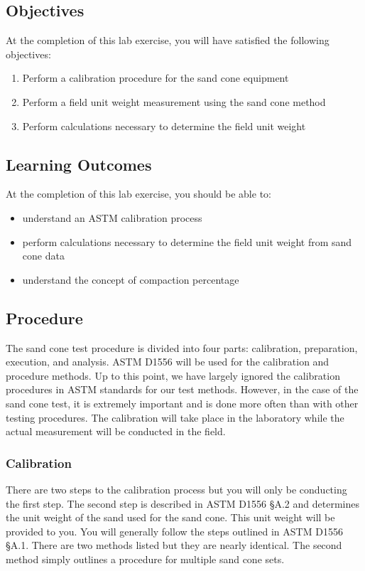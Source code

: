 \documentclass[12pt]{article}
\begin{document}
\subsection{Objectives}
\label{ssec:headingscap}
At the completion of this lab exercise, you will have satisfied the following objectives:
\begin{enumerate}
    \item Perform a calibration procedure for the sand cone equipment
    \item Perform a field unit weight measurement using the sand cone method
    \item Perform calculations necessary to determine the field unit weight
\end{enumerate}

\subsection{Learning Outcomes}
At the completion of this lab exercise, you should be able to:
\begin{itemize}
    \item understand an ASTM calibration process
    \item perform calculations necessary to determine the field unit weight from sand cone data
    \item understand the concept of compaction percentage
\end{itemize}

\pagebreak
\subsection{Procedure}
The sand cone test procedure is divided into four parts: calibration, preparation, execution, and analysis. ASTM D1556 will be used for the calibration and procedure methods. Up to this point, we have largely ignored the calibration procedures in ASTM standards for our test methods. However, in the case of the sand cone test, it is extremely important and is done more often than with other testing procedures. The calibration will take place in the laboratory while the actual measurement will be conducted in the field.

\subsubsection{Calibration}
There are two steps to the calibration process but you will only be conducting the first step. The second step is described in ASTM D1556 \S A.2 and determines the unit weight of the sand used for the sand cone. This unit weight will be provided to you. You will generally follow the steps outlined in ASTM D1556 \S A.1. There are two methods listed but they are nearly identical. The second method simply outlines a procedure for multiple sand cone sets.
\end{document}
